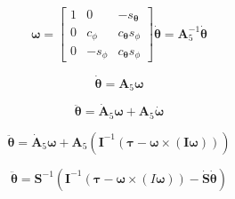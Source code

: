 \[
\boldsymbol\omega
=
\begin{bmatrix}
1 & 0		& -s_{\boldsymbol\theta} \\
0 & c_{\phi}	& c_{\boldsymbol\theta} s_{\phi} \\
0 & -s_{\phi}	& c_{\boldsymbol\theta} s_{\phi}
\end{bmatrix}
\dot{\boldsymbol\theta} 
= \mathbf{A}_5^{-1} \dot{\boldsymbol\theta}
\]

\[
\dot{\boldsymbol\theta} = \mathbf{A}_5 \boldsymbol\omega
\]

\[
\ddot{\boldsymbol\theta} = \dot{\mathbf{A}}_5 \boldsymbol\omega + \mathbf{A}_5 \dot{\boldsymbol\omega}
\]

\[
\ddot{\boldsymbol\theta}
= \dot{\mathbf{A}}_5 \boldsymbol\omega
+ \mathbf{A}_5 \left(
	\mathbf{I}^{-1} \left( \boldsymbol\tau - \boldsymbol\omega \times \left( \mathbf{I} \boldsymbol\omega \right) \right)
\right)
\]

\begin{equation}
\ddot{\boldsymbol\theta} =
\mathbf{S}^{-1} \left(
	\mathbf{I}^{-1} \left( \boldsymbol\tau - \boldsymbol\omega \times \left( I \boldsymbol\omega \right) \right)
	- \dot{\mathbf{S}} \dot{\boldsymbol\theta}
\right)
\label{eq:eom_theta}
\end{equation}










